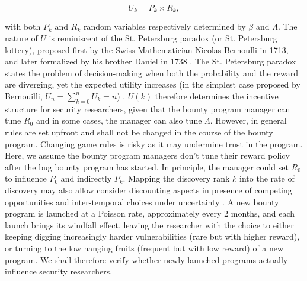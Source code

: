\begin{equation}
\label{ }
U_k = P_k \times R_k,
\end{equation}

\noindent with both $P_k$ and $R_k$ random variables respectively determined by $\beta$ and $\Lambda$. The nature of $U$ is reminiscent of the St. Petersburg paradox (or St. Petersburg lottery), proposed first by the Swiss Mathematician Nicolas Bernoulli in 1713, and later formalized by his brother Daniel in 1738 \cite{bernoulli1954exposition}. The St. Petersburg paradox states the problem of decision-making when both the probability and the reward are diverging, yet the expected utility increases (in the simplest case proposed by Bernouilli, $U_n = \sum_{k=0}^{n} U_k = n$) \cite{bernoulli1954exposition}. $U(k)$ therefore determines the incentive structure for security researchers, given that the bounty program manager can tune $R_0$ and in some cases, the manager can also tune $\Lambda$. However, in general rules are set upfront and shall not be changed in the course of the bounty program. Changing game rules is risky as it may undermine trust in the program. Here, we assume the bounty program managers don't tune their reward policy after the bug bounty program has started. In principle, the manager could set $R_0$ to influence $P_0$ and indirectly $P_{k}$. Mapping the discovery rank $k$ into the rate of discovery may also allow consider discounting aspects in presence of competing opportunities and inter-temporal choices under uncertainty \cite{loewenstein1992anomalies}. A new bounty program is launched at a Poisson rate, approximately every 2 months, and each launch brings its windfall effect, leaving the researcher with the choice to either keeping digging increasingly harder vulnerabilities (rare but with higher reward), or turning to the low hanging fruits (frequent but with low reward) of a new program. We shall therefore verify whether newly launched programs actually influence security researchers.
















